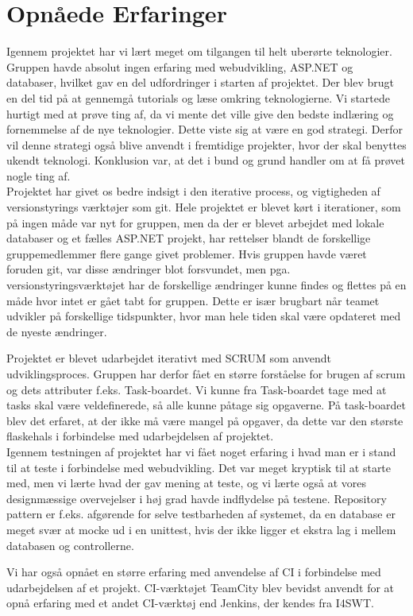 \chapter{Opnåede Erfaringer}

Igennem projektet har vi lært meget om tilgangen til helt uberørte teknologier. Gruppen havde absolut ingen erfaring med webudvikling, ASP.NET og databaser, hvilket gav en del udfordringer i starten af projektet. Der blev brugt en del tid på at gennemgå tutorials og læse omkring teknologierne. Vi startede hurtigt med at prøve ting af, da vi mente det ville give den bedste indlæring og fornemmelse af de nye teknologier. Dette viste sig at være en god strategi. Derfor vil denne strategi også blive anvendt i fremtidige projekter, hvor der skal benyttes ukendt teknologi. Konklusion var, at det i bund og grund handler om at få prøvet nogle ting af.\\


Projektet har givet os bedre indsigt i den iterative process, og vigtigheden af versionstyrings værktøjer som git. Hele projektet er blevet kørt i iterationer, som på ingen måde var nyt for gruppen, men da der er blevet arbejdet med lokale databaser og et fælles ASP.NET projekt, har rettelser blandt de forskellige gruppemedlemmer flere gange givet problemer. Hvis gruppen havde været foruden git, var disse ændringer blot forsvundet, men pga. versionstyringsværktøjet har de forskellige ændringer kunne findes og flettes på en måde hvor intet er gået tabt for gruppen. Dette er især brugbart når teamet udvikler på forskellige tidspunkter, hvor man hele tiden skal være opdateret med de nyeste ændringer.

Projektet er blevet udarbejdet iterativt med SCRUM som anvendt udviklingsproces. Gruppen har derfor fået en større forståelse for brugen af scrum og dets attributer f.eks. Task-boardet. Vi kunne fra Task-boardet tage med at tasks skal være veldefinerede, så alle kunne påtage sig opgaverne. På task-boardet blev det erfaret, at der ikke må være mangel på opgaver, da dette var den største flaskehals i forbindelse med udarbejdelsen af projektet.\\

Igennem testningen af projektet har vi fået noget erfaring i hvad man er i stand til at teste i forbindelse med webudvikling. Det var meget kryptisk til at starte med, men vi lærte hvad der gav mening at teste, og vi lærte også at vores designmæssige overvejelser i høj grad havde indflydelse på testene. Repository pattern er f.eks. afgørende for selve testbarheden af systemet, da en database er meget svær at mocke ud i en unittest, hvis der ikke ligger et ekstra lag i mellem databasen og controllerne.


Vi har også opnået en større erfaring med anvendelse af CI i forbindelse med udarbejdelsen af et projekt. CI-værktøjet TeamCity blev bevidst anvendt for at opnå erfaring med et andet CI-værktøj end Jenkins, der kendes fra I4SWT.


